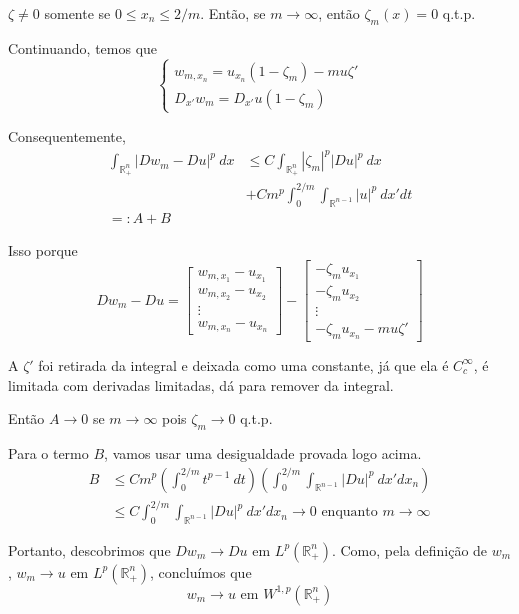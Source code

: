 \documentclass[a4paper, 11pt]{article}
\newcommand{\R}{\mathbb{R}}
\begin{document}
$ \zeta \neq 0  $ somente se $ 0 \leq x_n \leq 2/m $. Então, se $ m \rightarrow \infty $, então $\zeta_m(x) = 0 $ q.t.p.

Continuando, temos que \[ \begin{cases}
	w_{m,x_n}=u_{x_n}(1 - \zeta_m) - mu\zeta' \\
	D_{x'}w_m = D_{x'}u(1-\zeta_m)
\end{cases} \]

Consequentemente, \begin{align*}
	 \int_{\R^n_+} |Dw_m - Du|^p\ dx &\leq C \int_{\R^n_+} |\zeta_m|^p |Du|^p \ dx  \\
	  & +C m^p \int_0^{2/m} \int_{\R^{n-1}} |u|^p \ dx'dt \\
	 =: A + B
\end{align*}

Isso porque \[ Dw_m - Du = \begin{bmatrix}
	w_{m, x_1} - u_{x_1} \\
		w_{m, x_2} - u_{x_2} \\
	\vdots \\
	w_{m, x_n} - u_{x_n}
\end{bmatrix}  - \begin{bmatrix}
- \zeta_m u_{x_1} \\
-\zeta_m u_{x_2} \\
\vdots \\
-\zeta_m u_{x_n} - mu\zeta'
\end{bmatrix}\] 

A $ \zeta' $ foi retirada da integral e deixada como uma constante, já que ela é $C^\infty_c$, é limitada com derivadas limitadas, dá para remover da integral.


Então $A\rightarrow 0$ se $m\rightarrow \infty$ pois $\zeta_m \rightarrow 0$ q.t.p.

Para o termo $B$, vamos usar uma desigualdade provada logo acima. \begin{align*}
	B &\leq C m^p \left(\int_0^{2/m} t^{p-1}\ dt\right)\left(\int_0^{2/m} \int_{\R^{n-1}} |Du|^p \ dx' dx_n\right) \\
	&\leq C \int_0^{2/m} \int_{\R^{n-1}} |Du|^p \ dx'dx_n \rightarrow 0 \text{ enquanto } m \rightarrow \infty
\end{align*}

Portanto, descobrimos que $ Dw_m \rightarrow Du \text{ em } L^{p}(\R^n_+)$. Como, pela definição de $w_m$, $w_m\rightarrow u$ em $ L^p(\R^n_+)$, concluímos que \[ w_m \rightarrow u \text{ em } W^{1,p}(\R^n_+) \]
\end{document}
